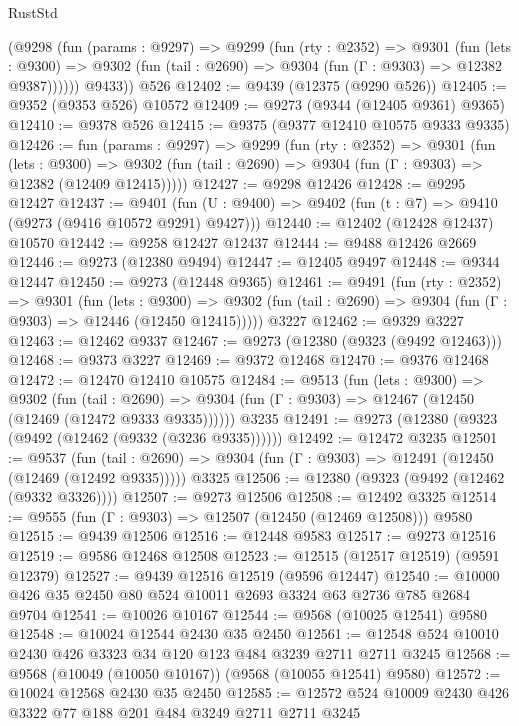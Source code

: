 \begin{lexlean}{RustStd}
\begin{coremodule}
        (@9298
          (fun (params : @9297) =>
          @9299
            (fun (rty : @2352) =>
            @9301
              (fun (lets : @9300) =>
              @9302 (fun (tail : @2690) => @9304 (fun (Γ : @9303) => @12382 @9387))))))
        @9433))
    @526
@12402 := @9439 (@12375 (@9290 @526))
@12405 := @9352 (@9353 @526) @10572
@12409 := @9273 (@9344 (@12405 @9361) @9365)
@12410 := @9378 @526
@12415 := @9375 (@9377 @12410 @10575 @9333 @9335)
@12426 := fun (params : @9297) =>
  @9299
    (fun (rty : @2352) =>
    @9301
      (fun (lets : @9300) =>
      @9302 (fun (tail : @2690) => @9304 (fun (Γ : @9303) => @12382 (@12409 @12415)))))
@12427 := @9298 @12426
@12428 := @9295 @12427
@12437 := @9401
    (fun (U : @9400) => @9402 (fun (t : @7) => @9410 (@9273 (@9416 @10572 @9291) @9427)))
@12440 := @12402 (@12428 @12437) @10570
@12442 := @9258 @12427 @12437
@12444 := @9488 @12426 @2669
@12446 := @9273 (@12380 @9494)
@12447 := @12405 @9497
@12448 := @9344 @12447
@12450 := @9273 (@12448 @9365)
@12461 := @9491
    (fun (rty : @2352) =>
    @9301
      (fun (lets : @9300) =>
      @9302 (fun (tail : @2690) => @9304 (fun (Γ : @9303) => @12446 (@12450 @12415)))))
    @3227
@12462 := @9329 @3227
@12463 := @12462 @9337
@12467 := @9273 (@12380 (@9323 (@9492 @12463)))
@12468 := @9373 @3227
@12469 := @9372 @12468
@12470 := @9376 @12468
@12472 := @12470 @12410 @10575
@12484 := @9513
    (fun (lets : @9300) =>
    @9302
      (fun (tail : @2690) =>
      @9304 (fun (Γ : @9303) => @12467 (@12450 (@12469 (@12472 @9333 @9335))))))
    @3235
@12491 := @9273 (@12380 (@9323 (@9492 (@12462 (@9332 (@3236 @9335))))))
@12492 := @12472 @3235
@12501 := @9537
    (fun (tail : @2690) => @9304 (fun (Γ : @9303) => @12491 (@12450 (@12469 (@12492 @9335)))))
    @3325
@12506 := @12380 (@9323 (@9492 (@12462 (@9332 @3326))))
@12507 := @9273 @12506
@12508 := @12492 @3325
@12514 := @9555 (fun (Γ : @9303) => @12507 (@12450 (@12469 @12508))) @9580
@12515 := @9439 @12506
@12516 := @12448 @9583
@12517 := @9273 @12516
@12519 := @9586 @12468 @12508
@12523 := @12515 (@12517 @12519) (@9591 @12379)
@12527 := @9439 @12516 @12519 (@9596 @12447)
@12540 := @10000 @426 @35 @2450 @80 @524 @10011 @2693 @3324 @63 @2736 @785 @2684 @9704
@12541 := @10026 @10167
@12544 := @9568 (@10025 @12541) @9580
@12548 := @10024 @12544 @2430 @35 @2450
@12561 := @12548 @524 @10010 @2430 @426 @3323 @34 @120 @123 @484 @3239 @2711 @2711 @3245
@12568 := @9568 (@10049 (@10050 @10167)) (@9568 (@10055 @12541) @9580)
@12572 := @10024 @12568 @2430 @35 @2450
@12585 := @12572 @524 @10009 @2430 @426 @3322 @77 @188 @201 @484 @3249 @2711 @2711 @3245

\end{coremodule}
\end{lexlean}
